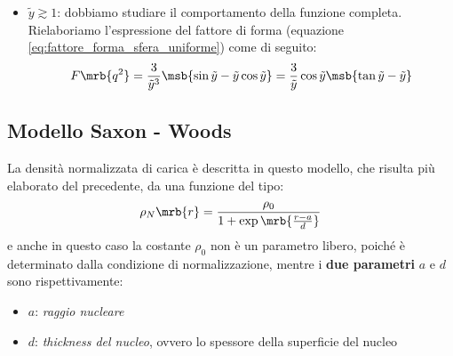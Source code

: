 \begin{itemize}
	\item $\tilde{y} \gtrsim 1$:
    dobbiamo studiare il comportamento della funzione completa. Rielaboriamo
    l'espressione del fattore di forma (equazione
    \ref{eq:fattore_forma_sfera_uniforme}) come di seguito:
    \begin{equation}
      F\mrb{q^2} = \frac{3}{\tilde{y}^3}\msb{\sin\tilde{y} -
      \tilde{y}\cos\tilde{y}} = \frac{3}{\tilde{y}} \cos\tilde{y}
      \msb{\tan\tilde{y} - \tilde{y}}
    \end{equation}
\end{itemize}

\subsection{Modello Saxon - Woods}
La densità normalizzata di carica è descritta in questo modello, che risulta
più elaborato del precedente, da una funzione del tipo:
\begin{equation}
	\rho_N\mrb{r} = \frac{\rho_0}{1 + \exp\mrb{\frac{r-a}{d}}}
\end{equation}
e anche in questo caso la costante $\rho_0$ non è un parametro libero, poiché è
determinato dalla condizione di normalizzazione, mentre i \textbf{due
parametri} $a$ e $d$ sono rispettivamente:
\begin{itemize}
	\item $a$: \textit{raggio nucleare}
  \item $d$: \textit{thickness del nucleo}, ovvero lo spessore della superficie
    del nucleo
\end{itemize}
